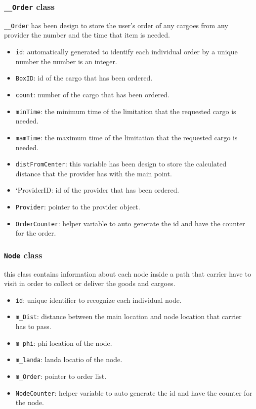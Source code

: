 \documentclass[oneside,titlepage,12pt]{memoir}
\begin{document}
\subsubsection{\texttt{\_\_Order} class}\label{order-class}

\texttt{\_\_Order} has been design to store the user's order of any
cargoes from any provider the number and the time that item is needed.

\begin{itemize}
\itemsep1pt\parskip0pt
\item
  \texttt{id}: automatically generated to identify each individual order
  by a unique number the number is an integer.
\item
  \texttt{BoxID}: id of the cargo that has been ordered.
\item
  \texttt{count}: number of the cargo that has been ordered.
\item
  \texttt{minTime}: the minimum time of the limitation that the
  requested cargo is needed.
\item
  \texttt{mamTime}: the maximum time of the limitation that the
  requested cargo is needed.
\item
  \texttt{distFromCenter}: this variable has been design to store the
  calculated distance that the provider has with the main point.
\item
  `ProviderID: id of the provider that has been ordered.
\item
  \texttt{Provider}: pointer to the provider object.
\item
  \texttt{OrderCounter}: helper variable to auto generate the id and
  have the counter for the order.
\end{itemize}

\subsubsection{\texttt{Node} class}\label{node-class}

this class contains information about each node inside a path that
carrier have to visit in order to collect or deliver the goods and
cargoes.

\begin{itemize}
\itemsep1pt\parskip0pt
\item
  \texttt{id}: unique identifier to recognize each individual node.
\item
  \texttt{m\_Dist}: distance between the main location and node location
  that carrier has to pass.
\item
  \texttt{m\_phi}: phi location of the node.
\item
  \texttt{m\_landa}: landa locatio of the node.
\item
  \texttt{m\_Order}: pointer to order list.
\item
  \texttt{NodeCounter}: helper variable to auto generate the id and have
  the counter for the node.
\end{itemize}
\end{document}
